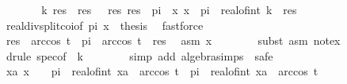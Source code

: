 \begin{isabellebody}
\ \ \ \ \isamarkupfalse%
\ \isamarkupfalse%
\ k\ res\ \ res{\isacharcolon}{\kern0pt}\ {\isachardoublequoteopen}{}\ {\isasymle}\ res{\isachardoublequoteclose}\ {\isachardoublequoteopen}res\ {\isacharless}{\kern0pt}\ {}{\isacharasterisk}{\kern0pt}pi{\isachardoublequoteclose}\ \ x{\isacharcolon}{\kern0pt}\ {\isachardoublequoteopen}x\ {\isacharequal}{\kern0pt}\ pi{\isacharasterisk}{\kern0pt}\ {}{\isacharasterisk}{\kern0pt}\ real{\isacharunderscore}{\kern0pt}of{\isacharunderscore}{\kern0pt}int\ k\ {\isacharplus}{\kern0pt}\ res{\isachardoublequoteclose}\isanewline
\ \ \ \ \ \ \isamarkupfalse%
\ real{\isacharunderscore}{\kern0pt}div{\isacharunderscore}{\kern0pt}split{\isacharunderscore}{\kern0pt}coi{\isacharbrackleft}{\kern0pt}of\ {\isachardoublequoteopen}{}{\isacharasterisk}{\kern0pt}pi{\isachardoublequoteclose}\ x\ {}\ thesis{\isacharbrackright}{\kern0pt}\ \isamarkupfalse%
\ fastforce\isanewline
\ \ \ \ \isamarkupfalse%
\ {\isachardoublequoteopen}res\ {\isacharless}{\kern0pt}\ arccos\ t\ {\isacharbar}{\kern0pt}\ {}{\isacharasterisk}{\kern0pt}pi\ {\isacharminus}{\kern0pt}\ arccos\ t\ {\isacharless}{\kern0pt}\ res{\isachardoublequoteclose}\ \isamarkupfalse%
\ asm\ x\isanewline
\ \ \ \ \ \ \isamarkupfalse%
\ {\isacharparenleft}{\kern0pt}subst\ {\isacharparenleft}{\kern0pt}asm{\isacharparenright}{\kern0pt}\ not{\isacharunderscore}{\kern0pt}ex{\isacharparenright}{\kern0pt}\isanewline
\ \ \ \ \ \ \isamarkupfalse%
\ {\isacharparenleft}{\kern0pt}drule\ spec{\isacharbrackleft}{\kern0pt}of\ {\isacharunderscore}{\kern0pt}\ {\isachardoublequoteopen}k{\isachardoublequoteclose}{\isacharbrackright}{\kern0pt}{\isacharparenright}{\kern0pt}\isanewline
\ \ \ \ \ \ \isamarkupfalse%
\ {\isacharparenleft}{\kern0pt}simp\ add{\isacharcolon}{\kern0pt}\ algebra{\isacharunderscore}{\kern0pt}simps\ {\isacharbar}{\kern0pt}\ safe{\isacharparenright}{\kern0pt}{\isacharplus}{\kern0pt}\isanewline
\ \ \ \ \isamarkupfalse%
\ \isamarkupfalse%
\ {\isachardoublequoteopen}{\isasymexists}xa{\isachardot}{\kern0pt}\ x\ {\isasymin}\ {\isacharbraceleft}{\kern0pt}{}\ {\isacharasterisk}{\kern0pt}\ pi\ {\isacharasterisk}{\kern0pt}\ real{\isacharunderscore}{\kern0pt}of{\isacharunderscore}{\kern0pt}int\ xa\ {\isacharminus}{\kern0pt}\ arccos\ t{\isacharless}{\kern0pt}{\isachardot}{\kern0pt}{\isachardot}{\kern0pt}{\isacharless}{\kern0pt}{}\ {\isacharasterisk}{\kern0pt}\ pi\ {\isacharasterisk}{\kern0pt}\ real{\isacharunderscore}{\kern0pt}of{\isacharunderscore}{\kern0pt}int\ xa\ {\isacharplus}{\kern0pt}\ arccos\ t{\isacharbraceright}{\kern0pt}{\isachardoublequoteclose}\isanewline

\end{isabellebody}
